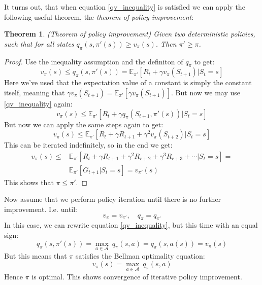 \documentclass[12pt, a4paper]{article}
\newtheorem{theorem}{Theorem}[section]
\numberwithin{equation}{section}
\begin{document}
It turns out, that when equation \ref{qv_inequality} is satisfied we can apply the following useful theorem, the \textit{theorem of policy improvement}:

\begin{theorem}
(Theorem of policy improvement) Given two deterministic policies, such that for all states $q_\pi(s,\pi'(s))\ge v_\pi(s)$. Then $\pi'\ge\pi$.
\end{theorem}
\begin{proof}
Use the inequality assumption and the definiton of $q_\pi$ to get:
\begin{equation}
v_\pi(s)\le q_\pi(s,\pi'(s))=\mathbb{E}_{\pi'}[R_t+\gamma v_\pi(S_{t+1})|S_t=s]
\end{equation}
Here we've used that the expectation value of a constant is simply the constant itself, meaning that $\gamma v_\pi(S_{t+1})=\mathbb{E}_{\pi'}[\gamma v_\pi(S_{t+1})]$. But now we may use \ref{qv_inequality} again:
\begin{equation}
v_\pi(s)\le\mathbb{E}_{\pi'}[R_t+\gamma q_\pi(S_{t+1},\pi'(s))|S_t=s]
\end{equation}
But now we can apply the same steps again to get:
\begin{equation}
v_\pi(s)\le\mathbb{E}_{\pi'}[R_t+\gamma R_{t+1}+\gamma^2 v_\pi(S_{t+2})|S_t=s]
\end{equation}
This can be iterated indefinitely, so in the end we get:
\begin{align}
v_\pi(s)\le&\mathbb{E}_{\pi'}[R_t+\gamma R_{t+1}+\gamma^2 R_{r+2}+\gamma^3 R_{r+3}+\cdots|S_t=s]=\\
&\mathbb{E}_{\pi'}[G_{t+1}|S_{t}=s]=v_{\pi'}(s)
\end{align}
This shows that $\pi\le\pi'$.
\end{proof}

Now assume that we perform policy iteration until there is no further improvement. I.e. until:
\begin{equation}
v_\pi=v_{\pi'},\quad q_\pi=q_{\pi'}
\end{equation}
In this case, we can rewrite equation \ref{qv_inequality}, but this time with an equal sign:
\begin{equation}
q_\pi(s,\pi'(s))=\underset{a\in\mathcal{A}}{\max}\ q_\pi(s,a)=q_\pi(s,a(s))=v_\pi(s)
\end{equation}
But this means that $\pi$ satisfies the Bellman optimality equation:
\begin{equation}
v_\pi(s)=\underset{a\in\mathcal{A}}{\max}\ q_\pi(s,a)
\end{equation}
Hence $\pi$ is optimal. This shows convergence of iterative policy improvement.
\end{document}
